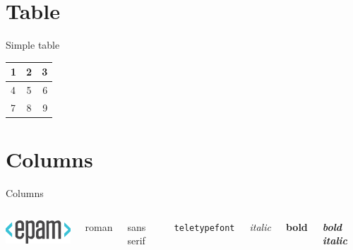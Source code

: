 \section{Table}

\begin{frame}{Simple table}

    \begin{tabular}{| l || c | r |}
      \hline
	  1 & 2 & 3 \\ \hline 
	  4 & 5 & 6 \\
	  7 & 8 & 9 \\
      \hline
    \end{tabular}
\end{frame}

\section{Columns}

\begin{frame}{Columns}
	\begin{columns}
		\center\includegraphics[width=3cm]{epam_primary}
		
		{\rmfamily roman}
		
		{\sffamily sans serif}
		
		{\tt teletypefont}
		
		{\it italic}
		
		{\bf bold}
		
		\textit{\textbf{bold italic}}
	\end{columns}
\end{frame}


